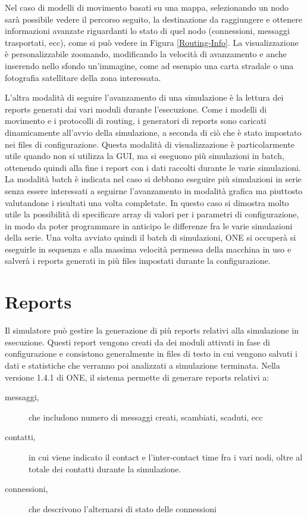 Nel caso di modelli di movimento basati su una mappa, selezionando un nodo sarà possibile vedere il percorso seguito, la destinazione da raggiungere e ottenere informazioni avanzate riguardanti lo stato di quel nodo (connessioni, messaggi trasportati, ecc), come si può vedere in Figura \ref{Routing-Info}. La visualizzazione è personalizzabile zoomando, modificando la velocità di avanzamento e anche inserendo nello sfondo un'immagine, come ad esempio una carta stradale o una fotografia satellitare della zona interessata.
\\


L'altra modalità di seguire l'avanzamento di una simulazione è la lettura dei reports generati dai vari moduli durante l'esecuzione. Come i modelli di movimento e i protocolli di routing, i generatori di reports sono caricati dinamicamente all'avvio della simulazione, a seconda di ciò che è stato impostato nei files di configurazione.
Questa modalità di visualizzazione è particolarmente utile quando non si utilizza la GUI, ma si eseguono più simulazioni in batch, ottenendo quindi alla fine i report con i dati raccolti durante le varie simulazioni.
\\

La modalità batch è indicata nel caso si debbano eseguire più simulazioni in serie senza essere interessati a seguirne l'avanzamento in modalità grafica ma piuttosto valutandone i risultati una volta completate. In questo caso si dimostra molto utile la possibilità di specificare array di valori per i parametri di configurazione, in modo da poter programmare in anticipo le differenze fra le varie simulazioni della serie. Una volta avviato quindi il batch di simulazioni, ONE si occuperà si eseguirle in sequenza e alla massima velocità permessa della macchina in uso e salverà i reports generati in più files impostati durante la configurazione.

\section{Reports}
Il simulatore può gestire la generazione di più reports relativi alla simulazione in esecuzione. Questi report vengono creati da dei moduli attivati in fase di configurazione e consistono generalmente in files di testo in cui vengono salvati i dati e statistiche che verranno poi analizzati a simulazione terminata. Nella versione 1.4.1 di ONE, il sistema permette di generare reports relativi a:
\begin{description}
\item[messaggi,] che includono numero di messaggi creati, scambiati, scaduti, ecc
\item[contatti,] in cui viene indicato il contact e l'inter-contact time fra i vari nodi, oltre al totale dei contatti durante la simulazione.
\item[connessioni,] che descrivono l'alternarsi di stato delle connessioni 
\end{description}


